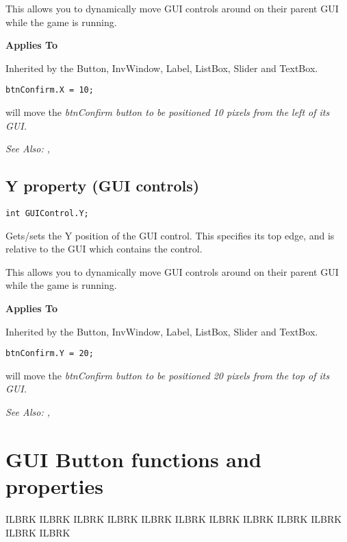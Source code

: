 This allows you to dynamically move GUI controls around on their parent GUI while the
game is running.

\bf{Applies To}

Inherited by the Button, InvWindow, Label, ListBox, Slider and TextBox.

\begin{verbatim}
btnConfirm.X = 10;
\end{verbatim}
will move the \it{btnConfirm} button to be positioned 10 pixels from the left of its GUI.

\it{See Also:} ,


\subsection{Y property (GUI controls)}\label{GUIControl.Y}%

\begin{verbatim}
int GUIControl.Y;
\end{verbatim}
Gets/sets the Y position of the GUI control. This specifies its top edge, and is
relative to the GUI which contains the control.

This allows you to dynamically move GUI controls around on their parent GUI while the
game is running.

\bf{Applies To}

Inherited by the Button, InvWindow, Label, ListBox, Slider and TextBox.

\begin{verbatim}
btnConfirm.Y = 20;
\end{verbatim}
will move the \it{btnConfirm} button to be positioned 20 pixels from the top of its GUI.

\it{See Also:} ,



\section{GUI Button functions and properties}%

ILBRK
ILBRK
ILBRK
ILBRK
ILBRK
ILBRK
ILBRK
ILBRK
ILBRK
ILBRK
ILBRK
ILBRK


